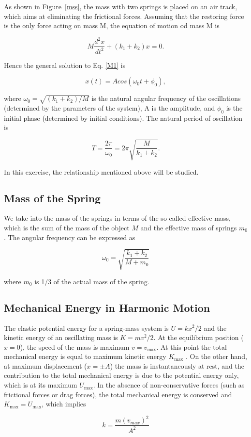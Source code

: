 As shown in Figure~\ref{mss}, the mass with two springs is placed on an
air track, which aims at eliminating the frictional forces. Assuming that the
restoring force is the only force acting on mass M, the equation of motion od
mass M is 

\begin{equation}
\label{M1}
M\frac{d^2x}{dt^2}+(k_1+k_2)x=0.
\end{equation}

Hence the general solution to Eq. \ref{M1} is

\begin{equation}
x(t)=Acos(\omega_0t+\phi_0),
\end{equation}

where $\omega_0=\sqrt{(k_1+k_2)/M}$ is the natural angular frequency of the
oscillations (determined by the parameters of the system), A is the amplitude,
and $\phi_0$ is the initial phase (determined by initial conditions). The
natural period of oscillation is 

\begin{equation}
T=\frac{2\pi}{\omega_0}=2\pi\sqrt{\frac{M}{k_1+k_2}}.
\end{equation}
    
In this exercise, the relationship mentioned above will be studied.
    
\subsection{Mass of the Spring}

We take into the mass of the springs in terms of the so-called
effective mass, which is the sum of the mass of the object $M$ and
the effective mass of springs $m_0$.
The angular frequency can be expressed as

\begin{equation}
  \label{omega1}
\omega_0=\sqrt{\frac{k_1+k_2}{M+m_0}}
\end{equation}

where $m_0$ is 1/3 of the actual mass of the spring.

\subsection{Mechanical Energy in Harmonic Motion}

The elastic potential energy for a spring-mass system is $U=kx^2/2$ and the
kinetic energy of an oscillating mass is $K=mv^2/2$.
At the equilibrium position ($x=0$), the speed of the mass is maximum
$v=v_{\max}$. 
At this point the total mechanical energy is equal to maximum kinetic energy
$K_{\max}$ . 
On the other hand, at maximum displacement ($x=\pm A$) the mass is
instantaneously at rest, and the contribution to the total mechanical energy is
due to the potential energy only, which is at its maximum $U_{\max}$. 
In the absence of non-conservative forces (such as frictional forces or drag
forces), the total mechanical energy is conserved and $K_{\max}=U_{\max}$, which
implies  

\begin{equation}
k=\frac{m (v_{max})^2}{A^2}
\label{kmv2_A2}
\end{equation}

